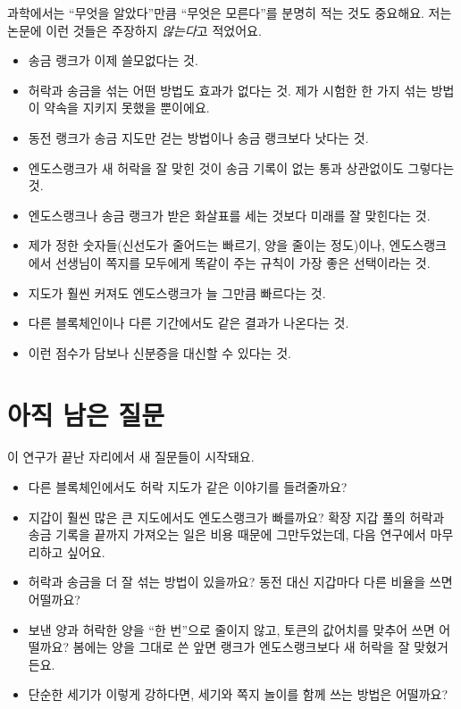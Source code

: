 과학에서는 “무엇을 알았다”만큼 “무엇은 모른다”를 분명히 적는 것도 중요해요.
저는 논문에 이런 것들은 주장하지 \emph{않는다}고 적었어요.

\begin{itemize}
\item 송금 랭크가 이제 쓸모없다는 것.
\item 허락과 송금을 섞는 어떤 방법도 효과가 없다는 것. 제가 시험한 한 가지 섞는 방법이 약속을 지키지 못했을 뿐이에요.
\item 동전 랭크가 송금 지도만 걷는 방법이나 송금 랭크보다 낫다는 것.
\item 엔도스랭크가 새 허락을 잘 맞힌 것이 송금 기록이 없는 통과 상관없이도 그렇다는 것.
\item 엔도스랭크나 송금 랭크가 받은 화살표를 세는 것보다 미래를 잘 맞힌다는 것.
\item 제가 정한 숫자들(신선도가 줄어드는 빠르기, 양을 줄이는 정도)이나, 엔도스랭크에서 선생님이 쪽지를 모두에게 똑같이 주는 규칙이 가장 좋은 선택이라는 것.
\item 지도가 훨씬 커져도 엔도스랭크가 늘 그만큼 빠르다는 것.
\item 다른 블록체인이나 다른 기간에서도 같은 결과가 나온다는 것.
\item 이런 점수가 담보나 신분증을 대신할 수 있다는 것.
\end{itemize}

\section{아직 남은 질문}

이 연구가 끝난 자리에서 새 질문들이 시작돼요.

\begin{itemize}
\item 다른 블록체인에서도 허락 지도가 같은 이야기를 들려줄까요?
\item 지갑이 훨씬 많은 큰 지도에서도 엔도스랭크가 빠를까요? 확장 지갑 풀의 허락과 송금 기록을 끝까지 가져오는 일은 비용 때문에 그만두었는데, 다음 연구에서 마무리하고 싶어요.
\item 허락과 송금을 더 잘 섞는 방법이 있을까요? 동전 대신 지갑마다 다른 비율을 쓰면 어떨까요?
\item 보낸 양과 허락한 양을 “한 번”으로 줄이지 않고, 토큰의 값어치를 맞추어 쓰면 어떨까요? 봄에는 양을 그대로 쓴 앞면 랭크가 엔도스랭크보다 새 허락을 잘 맞혔거든요.
\item 단순한 세기가 이렇게 강하다면, 세기와 쪽지 놀이를 함께 쓰는 방법은 어떨까요?
\end{itemize}

